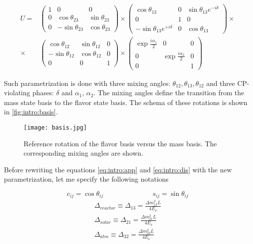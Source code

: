\documentclass[../main.tex]{subfiles}
\begin{document}
\begin{align}
\nonumber
U=&
\begin{pmatrix}
1   & 0                 & 0 \\
0   & \cos\theta_{23}   & \sin\theta_{23} \\
0   & -\sin\theta_{23}  & \cos\theta_{23}
\end{pmatrix}
\times
\begin{pmatrix}
\cos\theta_{13}                           & 0     & \sin\theta_{13}e^{-i\delta} \\
0                                         & 1     & 0 \\
-\sin\theta_{13}e^{+i\delta}              & 0     & \cos\theta_{13}
\end{pmatrix} \times \\
\times &
\begin{pmatrix}
\cos\theta_{12}   & \sin\theta_{12} & 0 \\
-\sin\theta_{12}  & \cos\theta_{12} & 0 \\
0                 & 0               & 1
\end{pmatrix}
\times
\begin{pmatrix}
\exp\frac{i\alpha_1}{2}   & 0                         & 0 \\
0                         & \exp\frac{i\alpha_2}{2}   & 0 \\
0                         &                           & 1
\end{pmatrix}
\label{eq:intro:osc_param}
\end{align}

Such parametrization is done with three mixing angles: $\theta_{12}, \theta_{13}, \theta_{12}$ and three CP-violating phases: $\delta$ and $\alpha_1$, $\alpha_2$. The mixing angles define the transition from the mass state basis to the flavor state basis. The schema of these rotations is shown in \autoref{fig:intro:basis}.

\begin{figure}[!ht]
  \centering
  \texttt{[image: basis.jpg]}
  \caption{Reference rotation of the flavor basis versus the mass basis. The corresponding mixing angles are shown.}
  \label{fig:intro:basis}
\end{figure}


Before rewriting the equations \ref{eq:intro:app} and \ref{eq:intro:dis} with the new parametrization, let me specify the following notations

\begin{equation}
c_{ij}=\cos\theta_{ij} \hspace{3cm} s_{ij}=\sin\theta_{ij}
\end{equation}
\begin{align}
\nonumber
\Delta_{reactor} \equiv \Delta_{13} = \frac{\Delta m^2_{13}L}{4E_\nu} \\
\Delta_{solar} \equiv \Delta_{21} = \frac{\Delta m^2_{21}L}{4E_\nu} \\
\Delta_{atm} \equiv\Delta_{32} = \frac{\Delta m^2_{32}L}{4E_\nu} \nonumber
\end{align}
\end{document}
